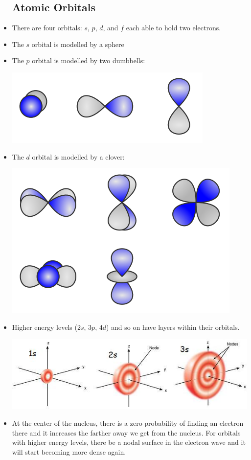\documentclass{article}
\numberwithin{equation}{section}
\theoremstyle{classic}
\begin{document}
\begin{itemize}
    \subsection{Atomic Orbitals}
    \item There are four orbitals: $s$, $p$, $d$, and $f$ each able to hold two electrons.
    \item The $s$ orbital is modelled by a sphere
    \begin{center}
    \end{center}
    \item The $p$ orbital is modelled by two dumbbells:
    \begin{center}\includegraphics[width=0.3\linewidth]{Q3.PNG}\end{center}
    \item The $d$ orbital is modelled by a clover:
    \begin{center}\includegraphics[width=0.3\linewidth]{Q4.PNG}\end{center}
    \item Higher energy levels ($2s$, $3p$, $4d$) and so on have layers within their orbitals.
    \begin{center}\includegraphics[width=0.6\linewidth]{Q5.PNG}\end{center}
    \item At the center of the nucleus, there is a zero probability of finding an electron there and it increases the farther away we get from the nucleus. For orbitals with higher energy levels, there be a nodal surface in the electron wave and it will start becoming more dense again.

\end{itemize}
\end{document}
